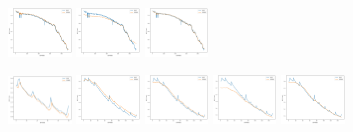 \documentclass{beamer}
\begin{document}
\begin{frame}
\begin{figure}[htbp]
			{\label{fig:subfig3}\includegraphics[width=0.15\textwidth]{figures/soh_cap/calce_CS2_36_mlp.jpg}}
			{\label{fig:subfig4}\includegraphics[width=0.15\textwidth]{figures/soh_cap/calce_CS2_36_lstm.jpg}}
			{\label{fig:subfig5}\includegraphics[width=0.15\textwidth]{figures/soh_cap/calce_CS2_36_cnn.jpg}}
	\end{figure}
	\begin{figure}[htbp]
		\centering
			{\label{fig:subfig1}\includegraphics[width=0.15\textwidth]{figures/soh_cap/nasa_B0005_ar.jpg}}
			{\label{fig:subfig2}\includegraphics[width=0.15\textwidth]{figures/soh_cap/nasa_B0005_svr.jpg}}
			{\label{fig:subfig3}\includegraphics[width=0.15\textwidth]{figures/soh_cap/nasa_B0005_mlp.jpg}}
			{\label{fig:subfig4}\includegraphics[width=0.15\textwidth]{figures/soh_cap/nasa_B0005_lstm.jpg}}
			{\label{fig:subfig5}\includegraphics[width=0.15\textwidth]{figures/soh_cap/nasa_B0005_cnn.jpg}}

\end{figure}
\end{frame}
\end{document}
